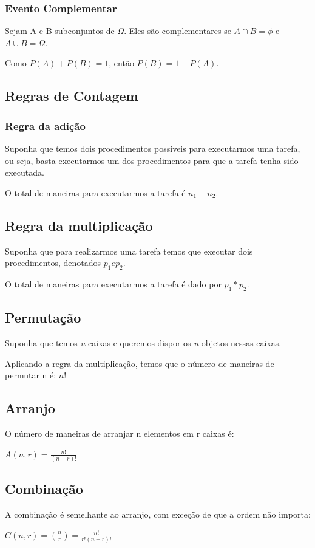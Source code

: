 \documentclass[a4paper, 12pt]{article}
\begin{document}
\subsubsection{Evento Complementar}
	Sejam A e B subconjuntos de $\Omega$. Eles são complementares se $A\cap B= \phi$ e $A\cup B = \Omega$.
	
	Como $P(A) + P(B) = 1$, então $P(B) = 1 - P(A)$.

\subsection{Regras de Contagem}
\subsubsection{Regra da adição}
	Suponha que temos dois procedimentos possíveis para executarmos uma tarefa, ou seja, basta executarmos um dos procedimentos para que a tarefa tenha sido executada.
	
	O total de maneiras para executarmos a tarefa é $n_{1} + n_{2}$.
	
\subsection{Regra da multiplicação}
	Suponha que para realizarmos uma tarefa temos que executar dois procedimentos, denotados $p_{1} e p_{2}$.
	
	O total de maneiras para executarmos a tarefa é dado por $p_{1}*p_{2}$.
	
\subsection{Permutação}
	Suponha que temos \textit{n} caixas e queremos dispor os \textit{n} objetos nessas caixas. 
	
	Aplicando a regra da multiplicação, temos que o número de maneiras de permutar n é: $n!$
	
\subsection{Arranjo}
	O número de maneiras de arranjar n elementos em r caixas é:
	\begin{center}
		\LARGE
		$A(n ,r) = \frac{n!}{(n-r)!}$
	\end{center}
	
\subsection{Combinação}
	A combinação é semelhante ao arranjo, com exceção de que a ordem não importa:
	\begin{center}
		\LARGE
		$C(n, r) = {n\choose r} = \frac{n!}{r!(n-r)!}$
	\end{center}
	
\end{document}
